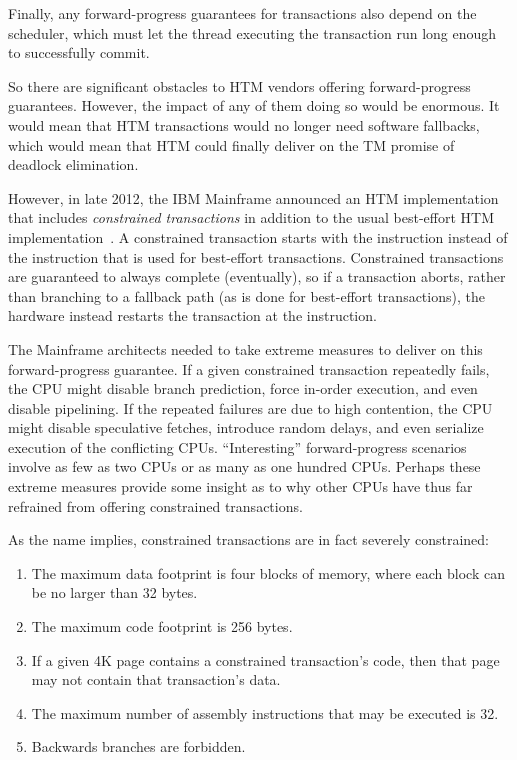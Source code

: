 Finally, any forward-progress guarantees for transactions also
depend on the scheduler, which must let the thread executing the
transaction run long enough to successfully commit.

So there are significant obstacles to HTM vendors offering forward-progress
guarantees.
However, the impact of any of them doing so would be enormous.
It would mean that HTM transactions would no longer need software
fallbacks, which would mean that HTM could finally deliver on the
TM promise of deadlock elimination.

However, in late 2012, the IBM Mainframe announced an HTM implementation
that includes \emph{constrained transactions} in addition to the usual
best-effort HTM
implementation~\cite{ChristianJacobi2012MainframeTM}.
A constrained transaction starts with the  instruction
instead of the  instruction that is used for best-effort
transactions.
Constrained transactions are guaranteed to always complete (eventually),
so if a transaction aborts, rather than branching to a fallback path
(as is done for best-effort transactions), the hardware instead restarts
the transaction at the  instruction.

The Mainframe architects needed to take extreme measures to deliver on
this forward-progress guarantee.
If a given constrained transaction repeatedly fails, the CPU
might disable branch prediction, force in-order execution, and even
disable pipelining.
If the repeated failures are due to high contention, the CPU might
disable speculative fetches, introduce random delays, and even
serialize execution of the conflicting CPUs.
``Interesting'' forward-progress scenarios involve as few as two CPUs
or as many as one hundred CPUs.
Perhaps these extreme measures provide some insight as to why other CPUs
have thus far refrained from offering constrained transactions.

As the name implies, constrained transactions are in fact severely constrained:

\begin{enumerate}
\item	The maximum data footprint is four blocks of memory,
	where each block can be no larger than 32 bytes.
\item	The maximum code footprint is 256 bytes.
\item	If a given 4K page contains a constrained transaction's code,
	then that page may not contain that transaction's data.
\item	The maximum number of assembly instructions that may be executed
	is 32.
\item	Backwards branches are forbidden.
\end{enumerate}

